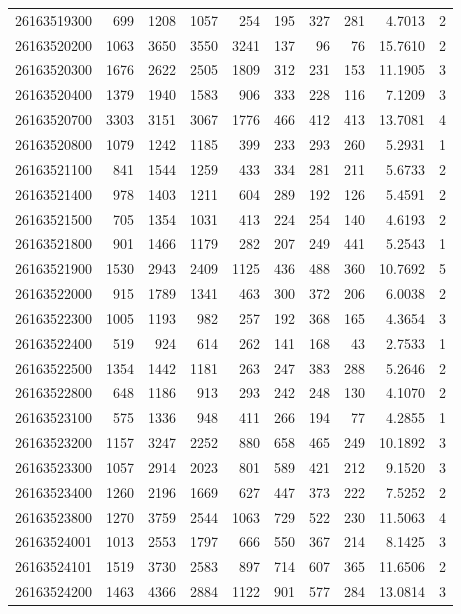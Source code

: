 \documentclass[
  11pt,
]{article}
\begin{document}
\begin{longtable}[t]{lrrrrrrrrr}
26163519300 & 699 & 1208 & 1057 & 254 & 195 & 327 & 281 & 4.7013 & 2\\
26163520200 & 1063 & 3650 & 3550 & 3241 & 137 & 96 & 76 & 15.7610 & 2\\
26163520300 & 1676 & 2622 & 2505 & 1809 & 312 & 231 & 153 & 11.1905 & 3\\
26163520400 & 1379 & 1940 & 1583 & 906 & 333 & 228 & 116 & 7.1209 & 3\\
26163520700 & 3303 & 3151 & 3067 & 1776 & 466 & 412 & 413 & 13.7081 & 4\\
26163520800 & 1079 & 1242 & 1185 & 399 & 233 & 293 & 260 & 5.2931 & 1\\
26163521100 & 841 & 1544 & 1259 & 433 & 334 & 281 & 211 & 5.6733 & 2\\
26163521400 & 978 & 1403 & 1211 & 604 & 289 & 192 & 126 & 5.4591 & 2\\
26163521500 & 705 & 1354 & 1031 & 413 & 224 & 254 & 140 & 4.6193 & 2\\
26163521800 & 901 & 1466 & 1179 & 282 & 207 & 249 & 441 & 5.2543 & 1\\
26163521900 & 1530 & 2943 & 2409 & 1125 & 436 & 488 & 360 & 10.7692 & 5\\
26163522000 & 915 & 1789 & 1341 & 463 & 300 & 372 & 206 & 6.0038 & 2\\
26163522300 & 1005 & 1193 & 982 & 257 & 192 & 368 & 165 & 4.3654 & 3\\
26163522400 & 519 & 924 & 614 & 262 & 141 & 168 & 43 & 2.7533 & 1\\
26163522500 & 1354 & 1442 & 1181 & 263 & 247 & 383 & 288 & 5.2646 & 2\\
26163522800 & 648 & 1186 & 913 & 293 & 242 & 248 & 130 & 4.1070 & 2\\
26163523100 & 575 & 1336 & 948 & 411 & 266 & 194 & 77 & 4.2855 & 1\\
26163523200 & 1157 & 3247 & 2252 & 880 & 658 & 465 & 249 & 10.1892 & 3\\
26163523300 & 1057 & 2914 & 2023 & 801 & 589 & 421 & 212 & 9.1520 & 3\\
26163523400 & 1260 & 2196 & 1669 & 627 & 447 & 373 & 222 & 7.5252 & 2\\
26163523800 & 1270 & 3759 & 2544 & 1063 & 729 & 522 & 230 & 11.5063 & 4\\
26163524001 & 1013 & 2553 & 1797 & 666 & 550 & 367 & 214 & 8.1425 & 3\\
26163524101 & 1519 & 3730 & 2583 & 897 & 714 & 607 & 365 & 11.6506 & 2\\
26163524200 & 1463 & 4366 & 2884 & 1122 & 901 & 577 & 284 & 13.0814 & 3\\

\end{longtable}
\end{document}
